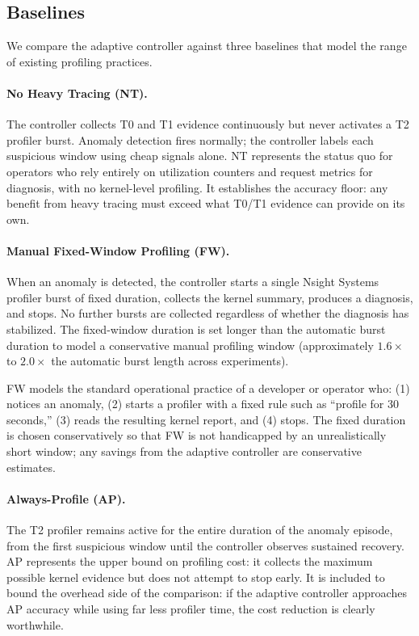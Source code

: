 \subsection{Baselines}

We compare the adaptive controller against three baselines that model the range of existing profiling practices.


\paragraph{No Heavy Tracing (\textsc{NT}).}
The controller collects T0 and T1 evidence continuously but never activates a T2 profiler burst. Anomaly detection fires normally; the controller labels each suspicious window using cheap signals alone. \textsc{NT} represents the status quo for operators who rely entirely on utilization counters and request metrics for diagnosis, with no kernel-level profiling. It establishes the accuracy floor: any benefit from heavy tracing must exceed what T0/T1 evidence can provide on its own.

\paragraph{Manual Fixed-Window Profiling (\textsc{FW}).}
When an anomaly is detected, the controller starts a single Nsight Systems profiler burst of fixed duration, collects the kernel summary, produces a diagnosis, and stops. No further bursts are collected regardless of whether the diagnosis has stabilized. The fixed-window duration is set longer than the automatic burst duration to model a conservative manual profiling window (approximately $1.6\times$ to $2.0\times$ the automatic burst length across experiments).

\textsc{FW} models the standard operational practice of a developer or operator who: (1) notices an anomaly, (2) starts a profiler with a fixed rule such as ``profile for 30 seconds,'' (3) reads the resulting kernel report, and (4) stops. The fixed duration is chosen conservatively so that \textsc{FW} is not handicapped by an unrealistically short window; any savings from the adaptive controller are conservative estimates.

\paragraph{Always-Profile (\textsc{AP}).}
The T2 profiler remains active for the entire duration of the anomaly episode, from the first suspicious window until the controller observes sustained recovery. \textsc{AP} represents the upper bound on profiling cost: it collects the maximum possible kernel evidence but does not attempt to stop early. It is included to bound the overhead side of the comparison: if the adaptive controller approaches \textsc{AP} accuracy while using far less profiler time, the cost reduction is clearly worthwhile.

